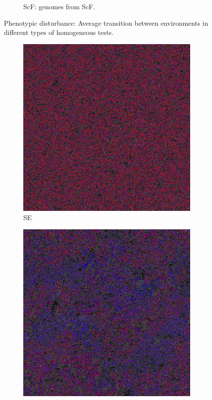 \begin{figure}[h]
\begin{subfigure}{.25\textwidth}
 \caption{ScF: genomes from ScF.}
 \label{fig:transonly}
\end{subfigure}
\caption{Phenotypic disturbance: Average transition between environments in different types of homogeneous tests.}
\label{fig:trans}
\end{figure}

\begin{figure}
\begin{subfigure}{.25\textwidth}
 \centering
 \includegraphics[width=.9\linewidth]{img/stable495000}
 \caption{SE}
\end{subfigure}%
\begin{subfigure}{.25\textwidth}
 \centering
 \includegraphics[width=.9\linewidth]{img/var495000}

\end{subfigure}
\end{figure}

